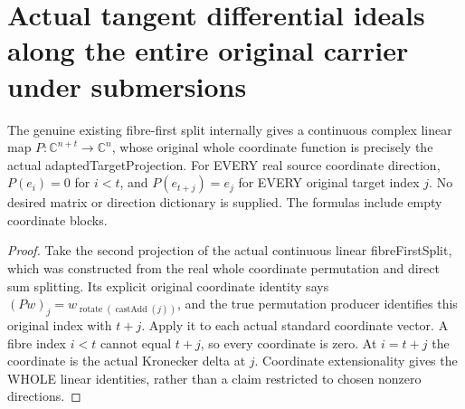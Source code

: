 \section{Actual tangent differential ideals along the entire original carrier under submersions}

\begin{lemma}
\label{hir:submersion-relative-differential-actual-linear-projection}
\leanok
The genuine existing fibre-first split internally gives a continuous complex
linear map $P:\mathbb C^{n+t}\to\mathbb C^n$, whose original whole coordinate
function is precisely the actual adaptedTargetProjection. For EVERY real
source coordinate direction, $P(e_i)=0$ for $i<t$, and $P(e_{t+j})=e_j$
for EVERY original target index $j$. No desired matrix or direction dictionary
is supplied. The formulas include empty coordinate blocks.
\end{lemma}
\begin{proof}
Take the second projection of the actual continuous linear fibreFirstSplit,
which was constructed from the real whole coordinate permutation and direct
sum splitting. Its explicit original coordinate identity says
$(Pw)_j=w_{\operatorname{rotate}(\operatorname{castAdd}(j))}$, and the true
permutation producer identifies this original index with $t+j$. Apply it to
each actual standard coordinate vector. A fibre index $i<t$ cannot equal
$t+j$, so every coordinate is zero. At $i=t+j$ the coordinate is the actual
Kronecker delta at $j$. Coordinate extensionality gives the WHOLE linear
identities, rather than a claim restricted to chosen nonzero directions.
\end{proof}

